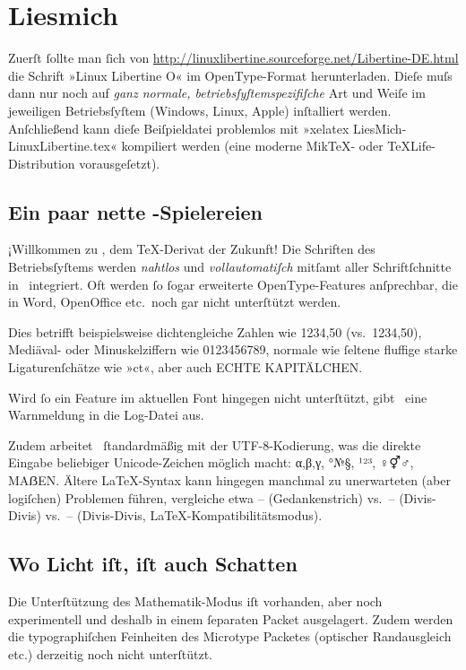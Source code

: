 ﻿\documentclass{scrartcl}
\begin{document}
\section*{Liesmich}
Zuerſt ſollte man ſich von \url{http://linuxlibertine.sourceforge.net/Libertine-DE.html} die Schrift »Linux Libertine O« im OpenType-Format herunterladen. Dieſe muſs dann nur noch auf \emph{ganz normale, betriebsſyſtemspezifiſche} Art und Weiſe im jeweiligen Betriebsſyſtem (Windows, Linux, Apple) inſtalliert werden. Anſchließend kann dieſe Beiſpieldatei problemlos mit »xelatex LiesMich-LinuxLibertine.tex« kompiliert werden (eine moderne Mik\TeX- oder \TeX Life-Distribution vorausgeſetzt).


\subsection*{Ein paar nette \XeLaTeX-Spielereien}
¡Willkommen zu \XeLaTeX, dem \TeX-Derivat der Zukunft! Die Schriften des Betriebsſyſtems werden \emph{nahtlos} und \emph{vollautomatiſch} mitſamt aller Schriftſchnitte in \XeTeX\ integriert. Oft werden ſo ſogar erweiterte OpenType-Features anſprechbar, die in Word, OpenOffice etc.\ noch gar nicht unterſtützt werden.

Dies betrifft beispielsweise dichtengleiche Zahlen wie {1234,50} (vs.\ 1234,50), Mediäval- oder Minuskelziffern wie {0123456789}, normale wie ſeltene {fluffige starke Ligaturenſchätze wie »ct«}, aber auch {ECHTE KAPITÄLCHEN}.

Wird ſo ein Feature im aktuellen Font hingegen nicht unterſtützt, gibt \XeTeX\ eine Warnmeldung in die Log-Datei aus.

Zudem arbeitet \XeLaTeX\ ſtandardmäßig mit der UTF-8-Kodierung, was die direkte Eingabe beliebiger Unicode-Zeichen möglich macht: α,β,γ, °№§, ¹²³, ♀⚥♂, MAẞEN. Ältere \LaTeX-Syntax kann hingegen manchmal zu unerwarteten (aber logiſchen) Problemen führen, vergleiche etwa – (Gedankenstrich) vs.\ -- (Divis-Divis) vs.\ {-- (Divis-Divis, \LaTeX-Kompatibilitätsmodus)}.


\subsection*{Wo Licht iſt, iſt auch Schatten}
Die Unterſtützung des Mathematik-Modus iſt vorhanden, aber noch experimentell und deshalb in einem ſeparaten Packet ausgelagert. Zudem werden die typographiſchen Feinheiten des Microtype Packetes (optischer Randausgleich etc.) derzeitig noch nicht unterſtützt.



\end{document}
